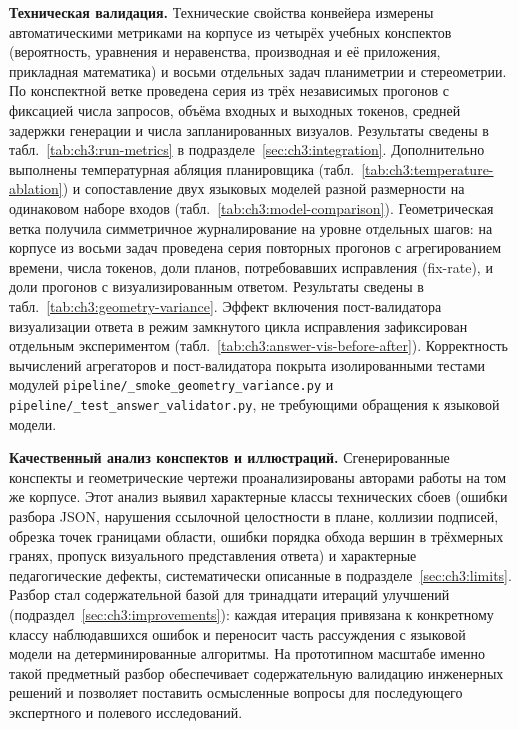 \textbf{Техническая валидация.} Технические свойства конвейера измерены
автоматическими метриками на корпусе из четырёх учебных конспектов
(вероятность, уравнения и неравенства, производная и её приложения,
прикладная математика) и восьми отдельных задач планиметрии и стереометрии.
По конспектной ветке проведена серия из трёх независимых прогонов с
фиксацией числа запросов, объёма входных и выходных токенов, средней
задержки генерации и числа запланированных визуалов. Результаты сведены в
табл.~\ref{tab:ch3:run-metrics} в подразделе~\ref{sec:ch3:integration}.
Дополнительно выполнены температурная абляция планировщика
(табл.~\ref{tab:ch3:temperature-ablation}) и сопоставление двух языковых
моделей разной размерности на одинаковом наборе входов
(табл.~\ref{tab:ch3:model-comparison}). Геометрическая ветка получила
симметричное журналирование на уровне отдельных шагов: на корпусе из восьми
задач проведена серия повторных прогонов с агрегированием времени, числа
токенов, доли планов, потребовавших исправления (fix\nobreakdash-rate), и
доли прогонов с визуализированным ответом. Результаты сведены в
табл.~\ref{tab:ch3:geometry-variance}. Эффект включения
пост\nobreakdash-валидатора визуализации ответа в режим замкнутого цикла
исправления зафиксирован отдельным экспериментом
(табл.~\ref{tab:ch3:answer-vis-before-after}). Корректность вычислений
агрегаторов и пост\nobreakdash-валидатора покрыта изолированными тестами
модулей \texttt{pipeline/\_smoke\_geometry\_variance.py} и
\texttt{pipeline/\_test\_answer\_validator.py}, не требующими обращения к
языковой модели.

\textbf{Качественный анализ конспектов и иллюстраций.} Сгенерированные
конспекты и геометрические чертежи проанализированы авторами работы на том
же корпусе. Этот анализ выявил характерные классы технических сбоев
(ошибки разбора JSON, нарушения ссылочной целостности в плане, коллизии
подписей, обрезка точек границами области, ошибки порядка обхода вершин в
трёхмерных гранях, пропуск визуального представления ответа) и характерные
педагогические дефекты, систематически описанные в
подразделе~\ref{sec:ch3:limits}. Разбор стал содержательной базой для
тринадцати итераций улучшений (подраздел~\ref{sec:ch3:improvements}):
каждая итерация привязана к конкретному классу наблюдавшихся ошибок и
переносит часть рассуждения с языковой модели на детерминированные
алгоритмы. На прототипном масштабе именно такой предметный разбор
обеспечивает содержательную валидацию инженерных решений и позволяет
поставить осмысленные вопросы для последующего экспертного и полевого
исследований.

